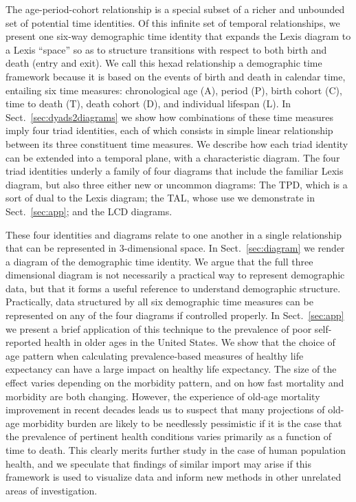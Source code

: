 \documentclass[12pt,oneside,a4paper]{article} %
\theoremstyle{definition}
\begin{document}
The age-period-cohort relationship is a special subset of a richer and unbounded
set of potential time identities. Of this infinite set of
temporal relationships, we present one six-way demographic time
identity that expands the Lexis diagram to a Lexis ``space'' so as to structure
transitions with respect to both birth and death (entry and exit). We call this
hexad relationship a demographic time framework because it is based on
the events of birth and death in calendar time, entailing six time measures:
chronological age (A), period (P), birth cohort (C), time to death (T), death cohort (D), and individual lifespan (L). In
Sect.~\ref{sec:dyads2diagrams} we show how combinations of these time measures imply four triad identities, each of which consists in simple linear relationship between its three
constituent time measures. We describe how each triad identity can be
extended into a temporal plane, with a characteristic diagram. The four triad
identities underly a family of four diagrams that include the
familiar Lexis diagram, but also three either new or
uncommon diagrams: The TPD, which is a sort of dual to the Lexis diagram; the TAL, whose use we demonstrate in Sect.~\ref{sec:app}; and the LCD diagrams.

These four identities and diagrams relate to one another in a single
relationship that can be represented in 3-dimensional space. 
In Sect.~\ref{sec:diagram} we render a diagram of the demographic time
identity. We argue that the full three dimensional diagram is not necessarily a
practical way to represent demographic data, but that it forms a useful
reference to understand demographic structure. Practically, data structured by
all six demographic time measures can be represented on any of the four diagrams
if controlled properly. In Sect.~\ref{sec:app} we present a brief
application of this technique to the prevalence of poor self-reported health in
older ages in the United States.  We show that the choice of age pattern when calculating
prevalence-based measures of healthy life expectancy can have a large impact on
healthy life expectancy. The size of the effect varies depending on the morbidity pattern, and on how fast mortality and
morbidity are both changing. However, the experience of old-age mortality
improvement in recent decades leads us to suspect that many projections of
old-age morbidity burden are likely to be needlessly pessimistic if it is the
case that the prevalence of pertinent health conditions varies primarily as a
function of time to death. This clearly merits further study in the case of human population
health, and we speculate that findings of similar import may arise if
this framework is used to visualize data and inform new methods in other
unrelated areas of investigation.
\end{document}
